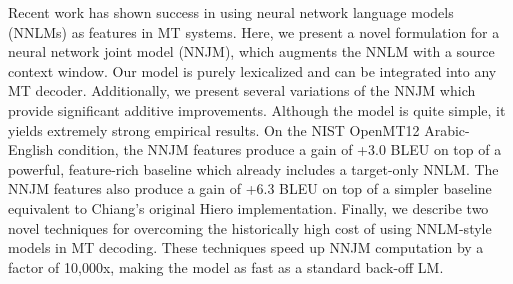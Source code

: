Recent work has shown success in using neural network language models (NNLMs) as features in MT systems. Here, we present a novel formulation for a neural network joint model (NNJM), which augments the NNLM with a source context window. Our model is purely lexicalized and can be integrated into any MT decoder. Additionally, we present several variations of the NNJM which provide significant additive improvements. Although the model is quite simple, it yields extremely strong empirical results. On the NIST OpenMT12 Arabic-English condition, the NNJM features produce a gain of +3.0 BLEU on top of a powerful, feature-rich baseline which already includes a target-only NNLM. The NNJM features also produce a gain of +6.3 BLEU on top of a simpler baseline equivalent to Chiang's original Hiero implementation. Finally, we describe two novel techniques for overcoming the historically high cost of using NNLM-style models in MT decoding. These techniques speed up NNJM computation by a factor of 10,000x, making the model as fast as a standard back-off LM.

